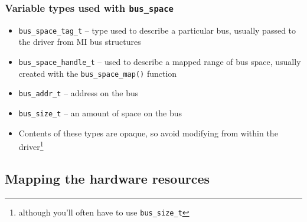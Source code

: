 \documentclass[dvipsnames,table]{beamer}
\begin{document}
\begin{frame}
\frametitle{Variable types used with {\tt bus\_space}}

\begin{itemize}
         \item {\tt bus\_space\_tag\_t} -- type used to describe a particular bus, usually passed to the driver from MI bus structures
         \item {\tt bus\_space\_handle\_t} --  used to describe a mapped range of bus space, usually created with the {\tt bus\_space\_map()} function
         \item {\tt bus\_addr\_t} -- address on the bus
         \item {\tt bus\_size\_t} -- an amount of space on the bus
         \item Contents of these types are opaque, so avoid modifying from within the driver\footnote{although you'll often have to use {\tt bus\_size\_t}}
\end{itemize}
\end{frame}


\subsection{Mapping the hardware resources}
\end{document}

